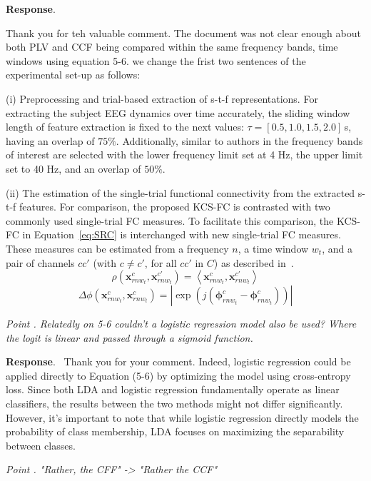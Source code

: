 \documentclass[runningheads]{llncs}
\newcommand{\ve}[1]{\bm {#1}}
\newenvironment{reviewer}{\setcounter{pointcounter}{1}}{}
\newcommand{\changes}[1]{\textcolor[rgb]{1.00,0.00,0.00}{#1}}
\newcommand{\point}[1]{\medskip \noindent
 \textsl{{\fontseries{b}\selectfont Point \thepointcounter}.
 \stepcounter{pointcounter} #1}}
\newcommand{\reply}{\medskip \noindent \textbf{Response}.\ }
\begin{document}
\begin{reviewer}
\reply{
    Thank you for teh valuable comment. The document was not clear enough about both PLV and CCF being compared within the same frequency bands, time windows using equation 5-6. we change the frist two sentences of the experimental set-up as follows:

    \changes{
({i}) Preprocessing and trial-based extraction of {s-t-f} representations. For extracting the subject EEG dynamics over time accurately, the sliding window length of feature extraction is fixed to the next values: $\tau=[0.5,1.0,1.5,2.0]$\,{s}, having an overlap of $75\%$. Additionally, similar to authors in \cite{ang2008filter} the frequency bands of interest are selected with the lower frequency limit set at 4 Hz, the upper limit set to 40 Hz, and an overlap of $50\%$.
}

\changes{
({ii}) The estimation of the single-trial functional connectivity from the extracted {s-t-f} features. For comparison, the proposed KCS-FC is contrasted with two commonly used single-trial FC measures. To facilitate this comparison, the KCS-FC in Equation~\eqref{eq:SRC} is interchanged with new single-trial FC measures. These measures can be estimated from a frequency $n$, a time window $w_t$, and a pair of channels ${cc'}$ (with $c \neq c'$, for all $cc'$ in $C$) as described in~\cite{rodrigue2019}.
\begin{equation}
			\rho(\ve{x}^{c}_{rnw_t},\ve{x}^{c'}_{rnw_t}) ={\left<\ve{x}^{c}_{rnw_t},\ve{x}^{c'}_{rnw_t}\right>}
\end{equation}
\begin{equation}		 
	{\Delta\phi(\ve{x}^{c}_{rnw_t},\ve{x}^{c}_{rnw_t})}  {= {|\exp(j(\ve{\phi}_{rnw_t}^{c}-\ve{\phi}_{rnw_t}^{c}))|}}
\end{equation}
}
}

\point{Relatedly on 5-6 couldn't a logistic regression model also be used? Where the logit is linear and passed through a sigmoid function. }

\reply{
    Thank you for your comment. Indeed, logistic regression could be applied directly to Equation (5-6) by optimizing the model using cross-entropy loss. Since both LDA and logistic regression fundamentally operate as linear classifiers, the results between the two methods might not differ significantly. However, it's important to note that while logistic regression directly models the probability of class membership, LDA focuses on maximizing the separability between classes.
}

\point{"Rather, the CFF" -> "Rather the CCF"}


\end{reviewer}
\end{document}
